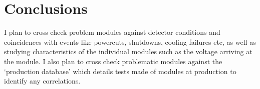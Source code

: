 \section{Conclusions}

I plan to cross check problem modules against detector conditions and coincidences with events like powercuts, shutdowns, cooling failures etc, as well as studying characteristics of the individual modules such as the voltage arriving at the module. I also plan to cross check problematic modules against the `production database' which details tests made of modules at production to identify any correlations. 
